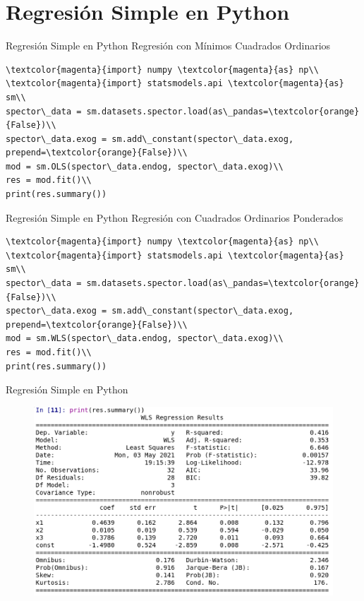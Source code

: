 \documentclass{beamer}
\begin{document}
\section{Regresión Simple en Python}
\begin{frame}{Regresión Simple en Python}
Regresión con Mínimos Cuadrados Ordinarios
\scriptsize
\begin{verbatim}
\textcolor{magenta}{import} numpy \textcolor{magenta}{as} np\\
\textcolor{magenta}{import} statsmodels.api \textcolor{magenta}{as} sm\\
spector\_data = sm.datasets.spector.load(as\_pandas=\textcolor{orange}{False})\\
spector\_data.exog = sm.add\_constant(spector\_data.exog, prepend=\textcolor{orange}{False})\\
mod = sm.OLS(spector\_data.endog, spector\_data.exog)\\
res = mod.fit()\\
print(res.summary())
\end{verbatim}
\end{frame}


\begin{frame}{Regresión Simple en Python}
Regresión con Cuadrados Ordinarios Ponderados\\
\scriptsize
\begin{verbatim}
\textcolor{magenta}{import} numpy \textcolor{magenta}{as} np\\
\textcolor{magenta}{import} statsmodels.api \textcolor{magenta}{as} sm\\
spector\_data = sm.datasets.spector.load(as\_pandas=\textcolor{orange}{False})\\
spector\_data.exog = sm.add\_constant(spector\_data.exog, prepend=\textcolor{orange}{False})\\
mod = sm.WLS(spector\_data.endog, spector\_data.exog)\\
res = mod.fit()\\
print(res.summary())
\end{verbatim}    
\end{frame}

\begin{frame}{Regresión Simple en Python}
\begin{figure}
\includegraphics[width=.85\textwidth]{Output.png}
\end{figure}
\end{frame}
\end{document}
